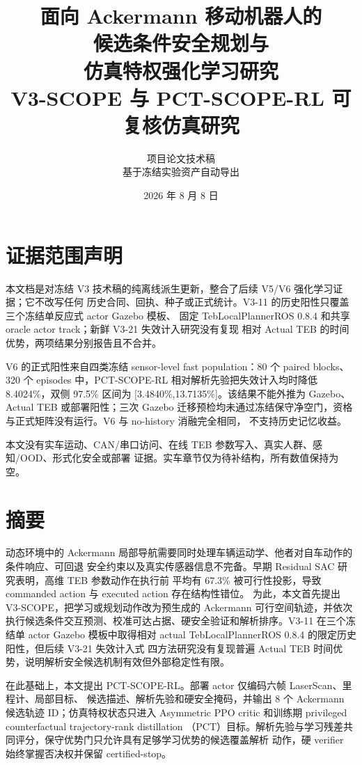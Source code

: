 \documentclass[12pt,a4paper,oneside]{report}
\title{\Huge 面向 Ackermann 移动机器人的\\候选条件安全规划与\\仿真特权强化学习研究\\[0.8em]\Large V3-SCOPE 与 PCT-SCOPE-RL 可复核仿真研究}
\author{项目论文技术稿\\\small 基于冻结实验资产自动导出}
\date{2026 年 8 月 8 日}
\begin{document}
\maketitle

\chapter*{证据范围声明}
本文档是对冻结 V3 技术稿的纯离线派生更新，整合了后续 V5/V6 强化学习证据；它不改写任何
历史合同、回执、种子或正式统计。V3-11 的历史阳性只覆盖三个冻结单反应式 actor Gazebo 模板、
固定 TebLocalPlannerROS 0.8.4 和共享 oracle actor track；新鲜 V3-21 失效计入研究没有复现
相对 Actual TEB 的时间优势，两项结果分别报告且不合并。

V6 的正式阳性来自四类冻结 sensor-level fast population：80 个 paired blocks、320 个 episodes
中，PCT-SCOPE-RL 相对解析先验把失效计入均时降低 8.4024\%，双侧 97.5\% 区间为
[3.4840\%,13.7135\%]。该结果不能外推为 Gazebo、Actual TEB 或部署阳性；三次 Gazebo
迁移预检均未通过冻结保守净空门，资格与正式矩阵没有运行。V6 与 no-history 消融完全相同，
不支持历史记忆收益。

本文没有实车运动、CAN/串口访问、在线 TEB 参数写入、真实人群、感知/OOD、形式化安全或部署
证据。实车章节仅为待补结构，所有数值保持为空。

\chapter*{摘要}
动态环境中的 Ackermann 局部导航需要同时处理车辆运动学、他者对自车动作的条件响应、可回退
安全约束以及真实传感器信息不完备。早期 Residual SAC 研究表明，高维 TEB 参数动作在执行前
平均有 67.3\% 被可行性投影，导致 commanded action 与 executed action 存在结构性错位。
为此，本文首先提出 V3-SCOPE，把学习或规划动作改为预生成的 Ackermann 可行空间轨迹，并依次
执行候选条件交互预测、校准可达占据、硬安全验证和解析排序。V3-11 在三个冻结单 actor Gazebo
模板中取得相对 actual TebLocalPlannerROS 0.8.4 的限定历史阳性，但后续 V3-21 失效计入式
四方法研究没有复现普遍 Actual TEB 时间优势，说明解析安全候选机制有效但外部稳定性有限。

在此基础上，本文提出 PCT-SCOPE-RL。部署 actor 仅编码六帧 LaserScan、里程计、局部目标、
候选描述、解析先验和硬安全掩码，并输出 8 个 Ackermann 候选轨迹 ID；仿真特权状态只进入
Asymmetric PPO critic 和训练期 privileged counterfactual trajectory-rank distillation
（PCT）目标。解析先验与学习残差共同评分，保守优势门只允许具有足够学习优势的候选覆盖解析
动作，硬 verifier 始终掌握否决权并保留 certified-stop。
\end{document}
